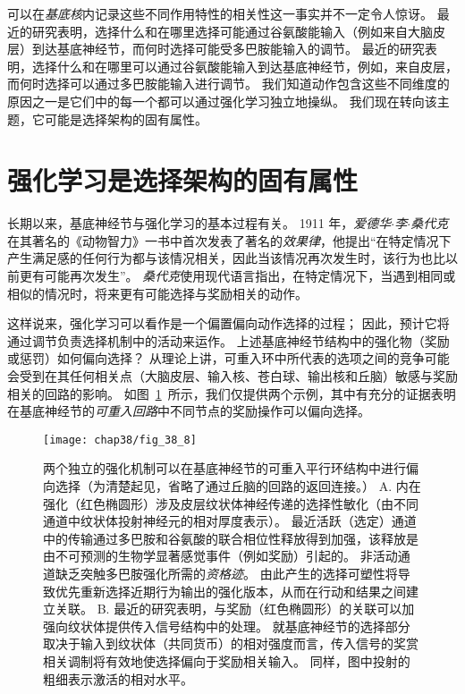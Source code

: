 可以在\textit{基底核}内记录这些不同作用特性的相关性这一事实并不一定令人惊讶。
最近的研究表明，选择什么和在哪里选择可能通过谷氨酸能输入（例如来自大脑皮层）到达基底神经节，而何时选择可能受多巴胺能输入的调节。
最近的研究表明，选择什么和在哪里可以通过谷氨酸能输入到达基底神经节，例如，来自皮层，而何时选择可以通过多巴胺能输入进行调节。
我们知道动作包含这些不同维度的原因之一是它们中的每一个都可以通过强化学习独立地操纵。
我们现在转向该主题，它可能是选择架构的固有属性。



\section{强化学习是选择架构的固有属性} \label{sec:38_7}

长期以来，基底神经节与强化学习的基本过程有关。
1911 年，\textit{爱德华$\cdot$李$\cdot$桑代克}在其著名的《动物智力》一书中首次发表了著名的\textit{效果律}，他提出“在特定情况下产生满足感的任何行为都与该情况相关，因此当该情况再次发生时，该行为也比以前更有可能再次发生”。
\textit{桑代克}使用现代语言指出，在特定情况下，当遇到相同或相似的情况时，将来更有可能选择与奖励相关的动作。


这样说来，强化学习可以看作是一个偏置偏向动作选择的过程；
因此，预计它将通过调节负责选择机制中的活动来运作。
上述基底神经节结构中的强化物（奖励或惩罚）如何偏向选择？
从理论上讲，可重入环中所代表的选项之间的竞争可能会受到在其任何相关点（大脑皮层、输入核、苍白球、输出核和丘脑）敏感与奖励相关的回路的影响。
如图~\ref{fig:38_8}~所示，我们仅提供两个示例，其中有充分的证据表明在基底神经节的\textit{可重入回路}中不同节点的奖励操作可以偏向选择。


\begin{figure}[htbp]
	\centering
	\texttt{[image: chap38/fig\_38\_8]}
	\caption{两个独立的强化机制可以在基底神经节的可重入平行环结构中进行偏向选择（为清楚起见，省略了通过丘脑的回路的返回连接。）
		A. 内在强化（红色椭圆形）涉及皮层纹状体神经传递的选择性敏化（由不同通道中纹状体投射神经元的相对厚度表示）。
		最近活跃（选定）通道中的传输通过多巴胺和谷氨酸的联合相位性释放得到加强，该释放是由不可预测的生物学显著感觉事件（例如奖励）引起的。
		非活动通道缺乏突触多巴胺强化所需的\textit{资格迹}。
		由此产生的选择可塑性将导致优先重新选择近期行为输出的强化版本，从而在行动和结果之间建立关联。
		B. 最近的研究表明，与奖励（红色椭圆形）的关联可以加强向纹状体提供传入信号结构中的处理。
		就基底神经节的选择部分取决于输入到纹状体（共同货币）的相对强度而言，传入信号的奖赏相关调制将有效地使选择偏向于奖励相关输入。
		同样，图中投射的粗细表示激活的相对水平。}
	\label{fig:38_8}
\end{figure}



